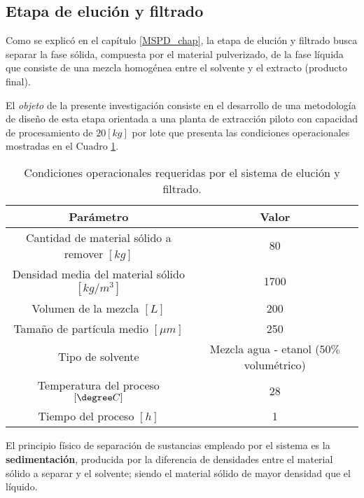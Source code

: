 \begin{center}
	\section{Etapa de eluci\'on y filtrado}
\end{center}

\noindent
\justify

Como se explic\'o en el cap\'itulo \ref{MSPD_chap}, la etapa de eluci\'on y filtrado busca separar la fase s\'olida, compuesta por el material pulverizado, de la fase l\'iquida que consiste de una mezcla homog\'enea entre el solvente y el extracto (producto final). 

\noindent
\justify

El \textit{objeto} de la presente investigaci\'on consiste en el desarrollo de una metodolog\'ia de dise\~no de esta etapa orientada a una planta de extracci\'on piloto con capacidad de procesamiento de $20 [kg]$ por lote que presenta las condiciones operacionales mostradas en el Cuadro \ref{condiciones}.

\begin{table}[h!]
	\centering
	\begin{tabular}{c|c}
		\hline
		\textbf{Par\'ametro} & \textbf{Valor} \\ \hline
		Cantidad de material s\'olido a remover $[kg]$ & 80 \\ \hline
		Densidad media del material s\'olido $\left[kg / m^3 \right]$ & 1700 \\ \hline
		Volumen de la mezcla $[L]$ & 200 \\ \hline
		Tama\~no de part\'icula medio $[\mu m]$ & 250 \\ \hline
		Tipo de solvente & Mezcla agua - etanol ($50 \%$ volum\'etrico) \\ \hline
		Temperatura del proceso $[\degree C]$ & 28 \\ \hline
		Tiempo del proceso $[h]$ & 1 \\ \hline
		
	\end{tabular}
	\caption{Condiciones operacionales requeridas por el sistema de eluci\'on y filtrado.}
	\label{condiciones}
\end{table}

\noindent
\justify

El principio f\'isico de separaci\'on de sustancias empleado por el sistema es la \textbf{sedimentaci\'on}, producida por la diferencia de densidades entre el material s\'olido a separar y el solvente; siendo el material s\'olido de mayor densidad que el l\'iquido.

